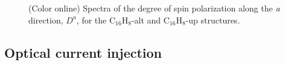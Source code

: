 \documentclass[pss]{wiley2sp} %
\begin{document}
\begin{figure}[t]
\hfill
{}
\caption{(Color online) Spectra of the degree of spin polarization along the
\emph{a} direction, {$D^{a}$}, for the C$_{16}$H$_{8}$-alt and
C$_{16}$H$_{8}$-up structures.\label{fig:Da}}
\end{figure}


\subsection{Optical current injection}\label{subsec:results-eta}
\end{document}
